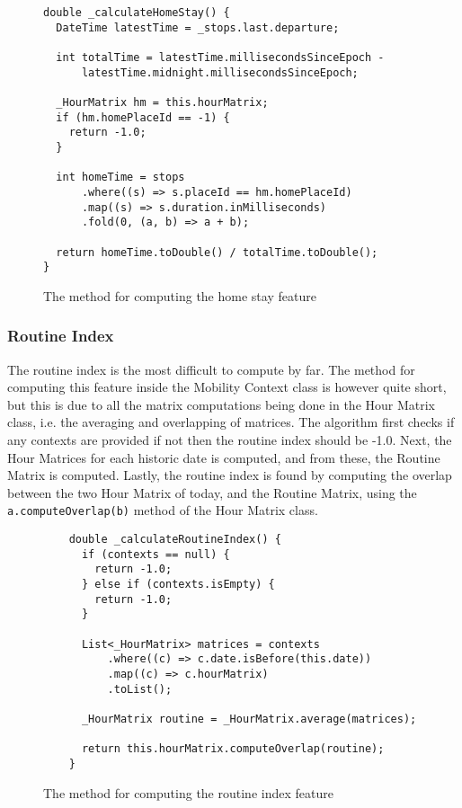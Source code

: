 \begin{figure}
    \centering
\begin{verbatim}
double _calculateHomeStay() {
  DateTime latestTime = _stops.last.departure;

  int totalTime = latestTime.millisecondsSinceEpoch -
      latestTime.midnight.millisecondsSinceEpoch;

  _HourMatrix hm = this.hourMatrix;
  if (hm.homePlaceId == -1) {
    return -1.0;
  }

  int homeTime = stops
      .where((s) => s.placeId == hm.homePlaceId)
      .map((s) => s.duration.inMilliseconds)
      .fold(0, (a, b) => a + b);

  return homeTime.toDouble() / totalTime.toDouble();
}
\end{verbatim}
    \caption{The method for computing the home stay feature}
    \label{fig:home-stay-code}
\end{figure}

\subsubsection*{Routine Index}
The routine index is the most difficult to compute by far. The method for computing this feature inside the Mobility Context class is however quite short, but this is due to all the matrix computations being done in the Hour Matrix class, i.e. the averaging and overlapping of matrices. The algorithm first checks if any contexts are provided if not then the routine index should be -1.0. Next, the Hour Matrices for each historic date is computed, and from these, the Routine Matrix is computed. Lastly, the routine index is found by computing the overlap between the two Hour Matrix of today, and the Routine Matrix, using the \verb|a.computeOverlap(b)| method of the Hour Matrix class.

\begin{figure}
    \centering
    \begin{verbatim}
    double _calculateRoutineIndex() {
      if (contexts == null) {
        return -1.0;
      } else if (contexts.isEmpty) {
        return -1.0;
      }
    
      List<_HourMatrix> matrices = contexts
          .where((c) => c.date.isBefore(this.date))
          .map((c) => c.hourMatrix)
          .toList();
    
      _HourMatrix routine = _HourMatrix.average(matrices);
    
      return this.hourMatrix.computeOverlap(routine);
    }
    \end{verbatim}
    \caption{The method for computing the routine index feature}
    \label{fig:routine-index-code}
\end{figure}

